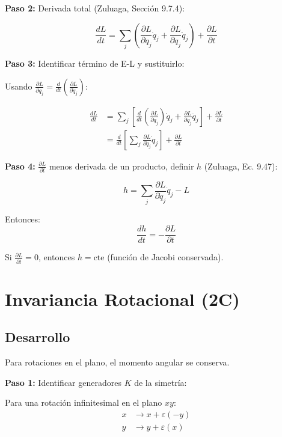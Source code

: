 \documentclass[a4paper]{article}
\begin{document}
\textbf{Paso 2:} Derivada total (Zuluaga, Sección 9.7.4):

\begin{equation}
\frac{dL}{dt} = \sum_j \left(\frac{\partial L}{\partial q_j}\dot{q}_j + \frac{\partial L}{\partial \dot{q}_j}\ddot{q}_j\right) + \frac{\partial L}{\partial t}
\end{equation}

\textbf{Paso 3:} Identificar término de E-L y sustituirlo:

Usando $\frac{\partial L}{\partial q_j} = \frac{d}{dt}\left(\frac{\partial L}{\partial \dot{q}_j}\right)$:

\begin{align}
\frac{dL}{dt} &= \sum_j \left[\frac{d}{dt}\left(\frac{\partial L}{\partial \dot{q}_j}\right)\dot{q}_j + \frac{\partial L}{\partial \dot{q}_j}\ddot{q}_j\right] + \frac{\partial L}{\partial t} \\
&= \frac{d}{dt}\left[\sum_j \frac{\partial L}{\partial \dot{q}_j}\dot{q}_j\right] + \frac{\partial L}{\partial t}
\end{align}

\textbf{Paso 4:} $\frac{\partial L}{\partial t}$ menos derivada de un producto, definir $h$ (Zuluaga, Ec. 9.47):

\begin{equation}
h = \sum_j \frac{\partial L}{\partial \dot{q}_j}\dot{q}_j - L
\end{equation}

Entonces:
\begin{equation}
\frac{dh}{dt} = -\frac{\partial L}{\partial t}
\end{equation}

Si $\frac{\partial L}{\partial t} = 0$, entonces $h = \text{cte}$ (función de Jacobi conservada).

\section{Invariancia Rotacional (2C)}

\subsection*{Desarrollo}

Para rotaciones en el plano, el momento angular se conserva.

\textbf{Paso 1:} Identificar generadores $K$ de la simetría:

Para una rotación infinitesimal en el plano $xy$:
\begin{align}
x &\rightarrow x + \varepsilon(-y) \\
y &\rightarrow y + \varepsilon(x)
\end{align}
\end{document}
